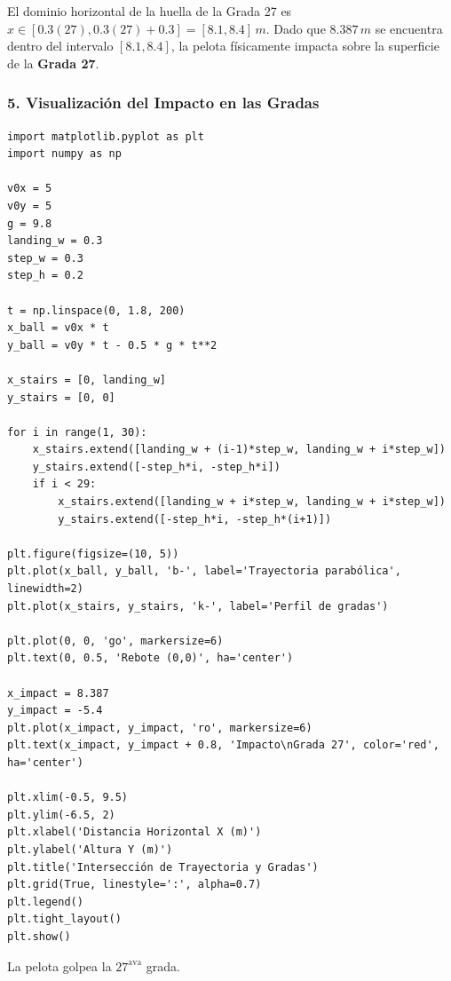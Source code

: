 \documentclass[12pt, a4paper]{article}
\begin{document}
El dominio horizontal de la huella de la Grada 27 es $x \in [0.3(27), 0.3(27) + 0.3] = [8.1, 8.4] \, \si{m}$.
Dado que $8.387 \, \si{m}$ se encuentra dentro del intervalo $[8.1, 8.4]$, la pelota físicamente impacta sobre la superficie de la \textbf{Grada 27}.


\subsubsection*{5. Visualización del Impacto en las Gradas}
\begin{verbatim}
import matplotlib.pyplot as plt
import numpy as np

v0x = 5
v0y = 5
g = 9.8
landing_w = 0.3
step_w = 0.3
step_h = 0.2

t = np.linspace(0, 1.8, 200)
x_ball = v0x * t
y_ball = v0y * t - 0.5 * g * t**2

x_stairs = [0, landing_w]
y_stairs = [0, 0]

for i in range(1, 30):
    x_stairs.extend([landing_w + (i-1)*step_w, landing_w + i*step_w])
    y_stairs.extend([-step_h*i, -step_h*i])
    if i < 29:
        x_stairs.extend([landing_w + i*step_w, landing_w + i*step_w])
        y_stairs.extend([-step_h*i, -step_h*(i+1)])

plt.figure(figsize=(10, 5))
plt.plot(x_ball, y_ball, 'b-', label='Trayectoria parabólica', linewidth=2)
plt.plot(x_stairs, y_stairs, 'k-', label='Perfil de gradas')

plt.plot(0, 0, 'go', markersize=6)
plt.text(0, 0.5, 'Rebote (0,0)', ha='center')

x_impact = 8.387
y_impact = -5.4
plt.plot(x_impact, y_impact, 'ro', markersize=6)
plt.text(x_impact, y_impact + 0.8, 'Impacto\nGrada 27', color='red', ha='center')

plt.xlim(-0.5, 9.5)
plt.ylim(-6.5, 2)
plt.xlabel('Distancia Horizontal X (m)')
plt.ylabel('Altura Y (m)')
plt.title('Intersección de Trayectoria y Gradas')
plt.grid(True, linestyle=':', alpha=0.7)
plt.legend()
plt.tight_layout()
plt.show()
\end{verbatim}

\begin{tcolorbox}[colback=green!5!white, colframe=green!50!black, title=Respuesta Final]
\centering \Large La pelota golpea la $27^\text{ava}$ grada.
\end{tcolorbox}
\end{document}
